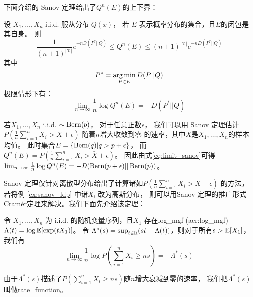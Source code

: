 下面介绍的 Sanov 定理给出了$Q^n(E)$的上下界：
\begin{theorem}
  设 $X_1, \dots, X_n$ i.i.d. 服从分布 $Q(x)$，
  若 $E$ 表示概率分布的集合，且$E$的闭包是其自身。
  则
  \begin{equation}
  \frac{1}{(n+1)^{|\mathcal{X}|}} e^{-n D(P^*||Q)}
  \leq Q^n(E) \leq (n+1)^{|\mathcal{X}|} e^{-n D(P^*||Q)}
  \end{equation}
  其中
  \begin{equation}
    P^* = \operatorname*{arg\,min}_{P\in E} D(P||Q)
  \end{equation}
  极限情形下有：
  \begin{equation}\label{eq:limit_sanov}
    \lim_{n\to \infty} \frac{1}{n} \log Q^n(E) = -D(P^*||Q)
  \end{equation}
\end{theorem}
\begin{example}\label{ex:sanov_ldp}
若$X_1, \dots, X_n$ i.i.d. $\sim \operatorname{Bern}(p)$，
对于任意正数$\epsilon$，
我们可以用 Sanov 定理估计 $P(\frac{1}{n} \sum_{i=1}^n X_i > \bar{X} + \epsilon)$ 随着$n$增大收敛到零
的速率，其中$\bar{X}$是$X_1,\dots, X_n$的样本均值。
此时集合$E=\{\operatorname{Bern}(q)| q>p+\epsilon\}$，
而$Q^n(E)=P(\frac{1}{n} \sum_{i=1}^n X_i > \bar{X} + \epsilon)$。
因此由式\eqref{eq:limit_sanov}可得
$\lim_{n\to \infty} \frac{1}{n} \log Q^n(E)=-D(\operatorname{Bern}(p+\epsilon)||\operatorname{Bern}(p))$。
\end{example}
Sanov 定理仅针对离散型分布给出了计算诸如$P(\frac{1}{n} \sum_{i=1}^n X_i > \bar{X} + \epsilon)$
的方法，若将例 \ref{ex:sanov_ldp} 中诸$X_i$ 改为高斯分布，
则可以用Sanov 定理的推广形式 Cramér定理来解决。我们下面先介绍该定理：

\begin{theorem}\label{thm:cramer}
  令 $X_1, \dots, X_n$ 为 i.i.d. 的随机变量序列，且$X_1$ 存在\gls{log_mgf} (\gls{acr:log_mgf})
$\Lambda(t)=\log \operatorname{\mathbb{E}}[\exp(t X_1)]$。
令 $\Lambda^*(s)= \sup_{t \in \mathbb{R}} (st-\Lambda(t))$，则对于所有$s>\operatorname{\mathbb{E}}[X_1]$，
我们有
\begin{equation}\label{eq:cramer}
\lim_{n\to \infty} \frac{1}{n}\log P\left(
  \sum_{i=1}^n X_i \geq  ns \right) = - \Lambda^*(s)
\end{equation}
\end{theorem}
由于$\Lambda^*(s)$描述了$P( \sum_{i=1}^n X_i \geq  ns)$随$n$增大衰减到零的速率，
我们把$\Lambda^*(s)$叫做\gls{rate_function}。


